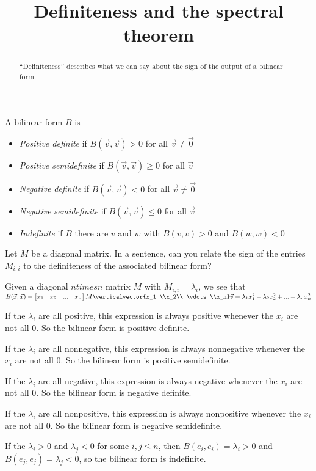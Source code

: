 \documentclass{ximera}
\title{Definiteness and the spectral theorem}
\begin{document}
\begin{abstract}
  ``Definiteness'' describes what we can say about the sign of the output of a bilinear form.
\end{abstract}

\begin{definition}
	A bilinear form $B$ is
	\begin{itemize}
		\item \textit{Positive definite} if $B(\vec{v},\vec{v}) > 0 $ for all $\vec{v} \neq \vec{0}$
		\item \textit{Positive semidefinite} if $B(\vec{v},\vec{v}) \geq 0 $ for all $\vec{v}$
		\item \textit{Negative definite} if $B(\vec{v},\vec{v}) < 0 $ for all $\vec{v} \neq \vec{0}$
		\item \textit{Negative semidefinite} if $B(\vec{v},\vec{v}) \leq 0 $ for all $\vec{v}$	
		\item \textit{Indefinite} if $B$ there are $v$ and $w$ with $B(v,v)>0$ and $B(w,w)<0$
		\end{itemize}
\end{definition}


	Let $M$ be a diagonal matrix.  In a sentence, can you relate the sign of the entries $M_{i,i}$ to the definiteness of the associated bilinear form? 
	
	\begin{free-response}
		Given a diagonal $n times n$ matrix $M$ with $M_{i,i} = \lambda_i$, we see that 
		\(
		B(\vec{x},\vec{x}) = \begin{bmatrix} x_1 & x_2 & ...& x_n\end{bmatrix} M  \verticalvector{x_1 \\x_2\\ \vdots \\x_n}\vec{v} = \lambda_1x_1^2 +\lambda_2x_2^2+...+\lambda_nx_n^2
		\)
		
		If the $\lambda_i$ are all positive, this expression is always positive whenever the $x_i$ are not all $0$.  So the bilinear form is positive definite.
		
		If the $\lambda_i$ are all nonnegative, this expression is always nonnegative whenever the $x_i$ are not all $0$.  So the bilinear form is positive semidefinite.
		
		If the $\lambda_i$ are all negative, this expression is always negative whenever the $x_i$ are not all $0$.  So the bilinear form is negative definite.
		
		If the $\lambda_i$ are all nonpositive, this expression is always nonpositive whenever the $x_i$ are not all $0$.  So the bilinear form is negative  semidefinite.
		
		If the $\lambda_i>0$ and $\lambda_j<0$  for some $i,j\leq n$, then $B(e_i,e_i) = \lambda_i >0$ and $B(e_j,e_j) = \lambda_j <0$, so the bilinear form 
		is indefinite. 
		 
	\end{free-response}
\end{document}
